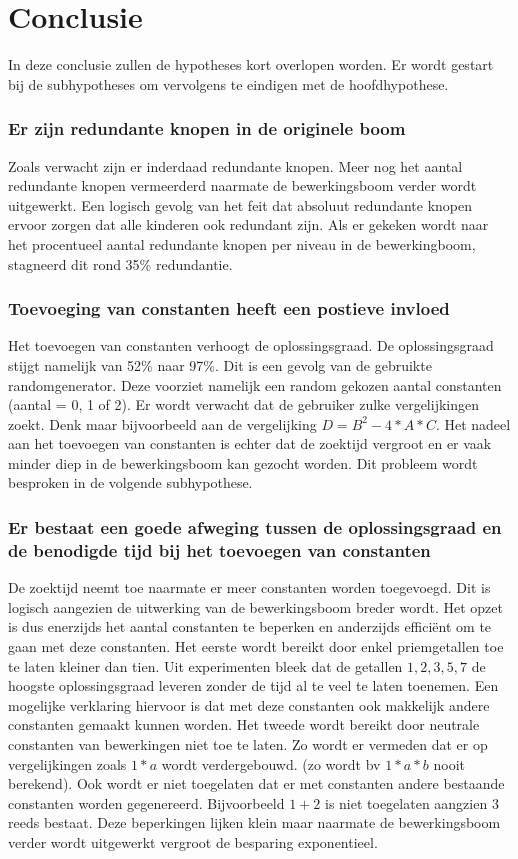 \documentclass[Main.tex]{subfiles}
\begin{document}
\section{Conclusie}
In deze conclusie zullen de hypotheses kort overlopen worden. Er wordt gestart bij de subhypotheses om vervolgens te eindigen met de hoofdhypothese.
\subsubsection{Er zijn redundante knopen in de originele boom}
Zoals verwacht zijn er inderdaad redundante knopen. Meer nog het aantal redundante knopen vermeerderd naarmate de bewerkingsboom verder wordt uitgewerkt. Een logisch gevolg van het feit dat absoluut redundante knopen ervoor zorgen dat alle kinderen ook redundant zijn. Als er gekeken wordt naar het procentueel aantal redundante knopen per niveau in de bewerkingboom, stagneerd dit rond 35\% redundantie.
\subsubsection{Toevoeging van constanten heeft een postieve invloed}
Het toevoegen van constanten verhoogt de oplossingsgraad. De oplossingsgraad stijgt namelijk van 52\% naar 97\%. Dit is een gevolg van de gebruikte randomgenerator. Deze voorziet namelijk een random gekozen aantal constanten (aantal = 0, 1 of 2). Er wordt verwacht dat de gebruiker zulke vergelijkingen zoekt. Denk maar bijvoorbeeld aan de vergelijking $D = B^{2} - 4 \ast A \ast C$. Het nadeel aan het toevoegen van constanten is echter dat de zoektijd vergroot en er vaak minder diep in de bewerkingsboom kan gezocht worden. Dit probleem wordt besproken in de volgende subhypothese.
\subsubsection{Er bestaat een goede afweging tussen de oplossingsgraad en de benodigde tijd bij het toevoegen van constanten}
De zoektijd neemt toe naarmate er meer constanten worden toegevoegd. Dit is logisch aangezien de uitwerking van de bewerkingsboom breder wordt. Het opzet is dus enerzijds het aantal constanten te beperken en anderzijds effici\"ent om te gaan met deze constanten. Het eerste wordt bereikt door enkel priemgetallen toe te laten kleiner dan tien. Uit experimenten bleek dat de getallen $1, 2, 3, 5, 7$ de hoogste oplossingsgraad leveren zonder de tijd al te veel te laten toenemen. Een mogelijke verklaring hiervoor is dat met deze constanten ook makkelijk andere constanten gemaakt kunnen worden. Het tweede wordt bereikt door neutrale constanten van bewerkingen niet toe te laten. Zo wordt er vermeden dat er op vergelijkingen zoals $1*a$ wordt verdergebouwd. (zo wordt bv $1*a*b$ nooit berekend). Ook wordt er niet toegelaten dat er met constanten andere bestaande constanten worden gegenereerd. Bijvoorbeeld $1+2$ is niet toegelaten aangzien $3$ reeds bestaat. Deze beperkingen lijken klein maar naarmate de bewerkingsboom verder wordt uitgewerkt vergroot de besparing exponentieel.
\end{document}
